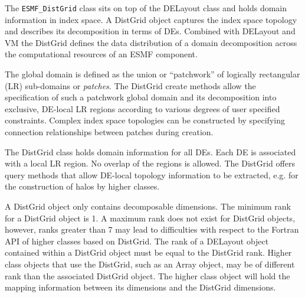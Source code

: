 

\label{sec:DistGrid}
The {\tt ESMF\_DistGrid} class sits on top of the DELayout class and holds domain information in index space. A DistGrid object captures the index space topology and describes its decomposition in terms of DEs. Combined with DELayout and VM the DistGrid defines the data distribution of a domain decomposition across the computational resources of an ESMF component.

The global domain is defined as the union or ``patchwork'' of logically rectangular (LR) sub-domains or {\em patches}. The DistGrid create methods allow the specification of such a patchwork global domain and its decomposition into exclusive, DE-local LR regions according to various degrees of user specified constraints. Complex index space topologies can be constructed by specifying connection relationships between patches during creation.

The DistGrid class holds domain information for all DEs. Each DE is associated with a local LR region. No overlap of the regions is allowed. The DistGrid offers query methods that allow DE-local topology information to be extracted, e.g. for the construction of halos by higher classes.

A DistGrid object only contains decomposable dimensions. The minimum rank for a DistGrid object is 1. A maximum rank does not exist for DistGrid objects, however, ranks greater than 7 may lead to difficulties with respect to the Fortran API of higher classes based on DistGrid. The rank of a DELayout object contained within a DistGrid object must be equal to the DistGrid rank. Higher class objects that use the DistGrid, such as an Array object, may be of different rank than the associated DistGrid object. The higher class object will hold the mapping information between its dimensions and the DistGrid dimensions.
